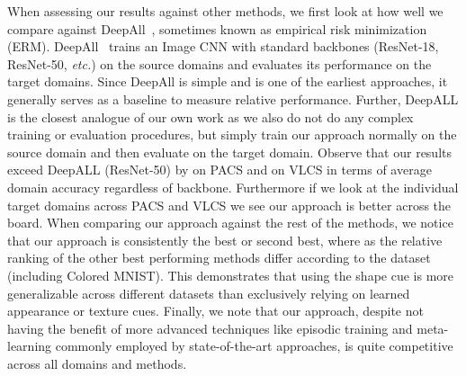 When assessing our results against other methods, we first look at how well we compare against DeepAll~\cite{Li:etal:ICCV17}, sometimes known as empirical risk minimization (ERM). DeepAll~\cite{Li:etal:ICCV17} trains an Image CNN with standard backbones (ResNet-18, ResNet-50, \emph{etc.}) on the source domains and evaluates its performance on the target domains. Since DeepAll is simple and is  one of the earliest approaches, it generally serves as a baseline to measure relative performance. Further, DeepALL is the closest analogue of our own work as we also do not do any complex training or evaluation procedures, but simply train our approach normally on the source domain and then evaluate on the target domain. Observe that our results exceed DeepALL (ResNet-50) by  on PACS and  on VLCS in terms of average domain accuracy regardless of backbone. Furthermore if we look at the individual target domains across PACS and VLCS we see our approach is better across the board. When comparing our approach against the rest of the methods, we notice that our approach is consistently the best or second best, where as the relative ranking of the other best performing methods differ according to the dataset (including Colored MNIST). This demonstrates that using the shape cue is more generalizable across different datasets than exclusively relying on learned appearance or texture cues. Finally, we note that our approach, despite not having the benefit of more advanced techniques like episodic training and meta-learning commonly employed by state-of-the-art approaches, is quite competitive across all domains and methods.











































































